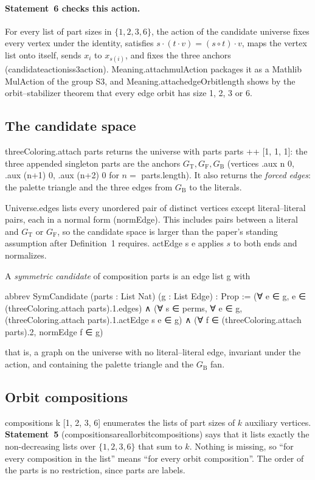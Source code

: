 \documentclass[11pt,a4paper]{article}
\newcommand{\leanus}{\textunderscore\allowbreak}
\newcommand{\lean}[1]{{\ttfamily\let\_\leanus #1}}
\newcommand{\GT}{G_{\mathrm{T}}}
\newcommand{\GF}{G_{\mathrm{F}}}
\newcommand{\GB}{G_{\mathrm{B}}}
\theoremstyle{definition}
\begin{document}
\paragraph{Statement~6 checks this action.}
For every list of part sizes in $\{1,2,3,6\}$, the action of the candidate
universe fixes every vertex under the identity, satisfies
$s\cdot(t\cdot v)=(s\circ t)\cdot v$, maps the vertex list onto itself, sends
$x_i$ to $x_{s(i)}$, and fixes the three anchors
(\lean{candidate\_action\_is\_s3\_action}). \lean{Meaning.attach\_mulAction}
packages it as a Mathlib \lean{MulAction} of the group \lean{S3}, and
\lean{Meaning.attach\_edgeOrbit\_length} shows by the orbit--stabilizer
theorem that every edge orbit has size 1, 2, 3 or 6.

\subsection{The candidate space}
\lean{threeColoring.attach parts} returns the universe with parts
\lean{parts ++ [1, 1, 1]}: the three appended singleton parts are the anchors
$\GT,\GF,\GB$ (vertices \lean{.aux n 0}, \lean{.aux (n+1) 0},
\lean{.aux (n+2) 0} for $n=$ \lean{parts.length}). It also returns the
\emph{forced edges}: the palette triangle and the three edges from $\GB$ to
the literals.

\lean{Universe.edges} lists every unordered pair of distinct vertices except
literal--literal pairs, each in a normal form (\lean{normEdge}). This
includes pairs between a literal and $\GT$ or $\GF$, so the candidate space
is larger than the paper's standing assumption after Definition~1 requires.
\lean{actEdge s e} applies $s$ to both ends and normalizes.

A \emph{symmetric candidate} of composition \lean{parts} is an edge list
\lean{g} with
\begin{code}
abbrev SymCandidate (parts : List Nat) (g : List Edge) : Prop :=
  (∀ e ∈ g, e ∈ (threeColoring.attach parts).1.edges) ∧
  (∀ s ∈ perms, ∀ e ∈ g, (threeColoring.attach parts).1.actEdge s e ∈ g) ∧
  (∀ f ∈ (threeColoring.attach parts).2, normEdge f ∈ g)
\end{code}
that is, a graph on the universe with no literal--literal edge, invariant
under the action, and containing the palette triangle and the $\GB$ fan.

\subsection{Orbit compositions}\label{sec:comp}
\lean{compositions k [1, 2, 3, 6]} enumerates the lists of part sizes of $k$
auxiliary vertices. \textbf{Statement~5} (\lean{compositions\_are\_all\_orbit\_compositions})
says that it lists exactly the non-decreasing lists over $\{1,2,3,6\}$ that
sum to $k$. Nothing is missing, so ``for every composition in the list''
means ``for every orbit composition''. The order of the parts is no
restriction, since parts are labels.
\end{document}
